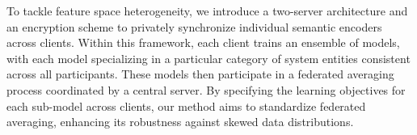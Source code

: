 To tackle feature space heterogeneity, we introduce a two-server architecture and an encryption scheme to privately synchronize individual semantic encoders across clients. Within this framework, each client trains an ensemble of \gnnshort models, with each model specializing in a particular category of system entities consistent across all participants. These models then participate in a federated averaging process coordinated by a central server. By specifying the learning objectives for each sub-model across clients, our method aims to standardize federated averaging, enhancing its robustness against skewed data distributions.

